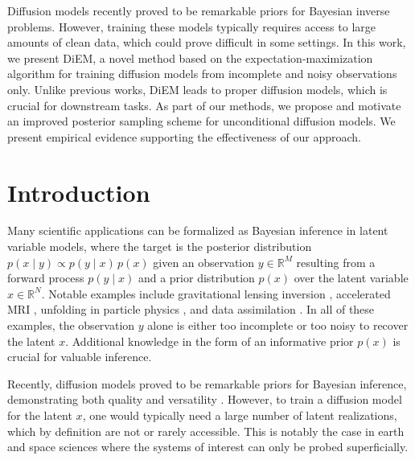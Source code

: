 Diffusion models recently proved to be remarkable priors for Bayesian inverse problems. However, training these models typically requires access to large amounts of clean data, which could prove difficult in some settings. In this work, we present DiEM, a novel method based on the expectation-maximization algorithm for training diffusion models from incomplete and noisy observations only. Unlike previous works, DiEM leads to proper diffusion models, which is crucial for downstream tasks. As part of our methods, we propose and motivate an improved posterior sampling scheme for unconditional diffusion models. We present empirical evidence supporting the effectiveness of our approach.

\section{Introduction}

Many scientific applications can be formalized as Bayesian inference in latent variable models, where the target is the posterior distribution $p(x \mid y) \propto p(y \mid x) \, p(x)$ given an observation $y \in \mathbb{R}^M$ resulting from a forward process $p(y \mid x)$ and a prior distribution $p(x)$ over the latent variable $x \in \mathbb{R}^N$. Notable examples include gravitational lensing inversion \cite{warren2003semilinear, morningstar2019datadriven, mishra-sharma2022strong}, accelerated MRI \cite{wang2016accelerating, hammernik2018learning, han2020kspace, zbontar2018fastmri, knoll2020fastmri}, unfolding in particle physics \cite{cowan2002survey, blobel2011unfolding}, and data assimilation \cite{ledimet1986variational, tremolet2006accounting, hamill2006ensemblebased, carrassi2018data}. In all of these examples, the observation $y$ alone is either too incomplete or too noisy to recover the latent $x$. Additional knowledge in the form of an informative prior $p(x)$ is crucial for valuable inference.

Recently, diffusion models \cite{sohl-dickstein2015deep, ho2020denoising} proved to be remarkable priors for Bayesian inference, demonstrating both quality and versatility \cite{song2022solving, kawar2021snips, kawar2022denoising, adam2022posterior, chung2023diffusion, song2023pseudoinverseguided, rozet2023scorebased, finzi2023userdefined, boys2023tweedie, zhu2023denoising, dia2023bayesian}. However, to train a diffusion model for the latent $x$, one would typically need a large number of latent realizations, which by definition are not or rarely accessible. This is notably the case in earth and space sciences where the systems of interest can only be probed superficially.

